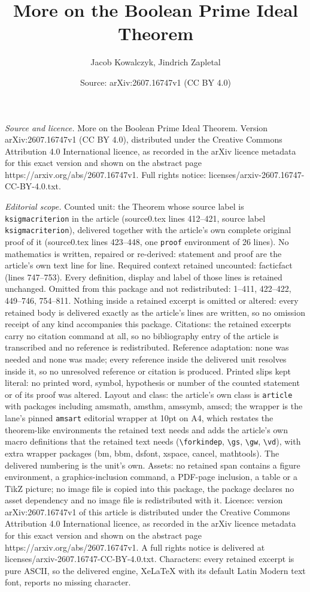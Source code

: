 \documentclass[10pt,a4paper]{amsart}
\title[More on the Boolean Prime Ideal Theorem]{More on the Boolean Prime Ideal Theorem}
\author{Jacob Kowalczyk, Jindrich Zapletal}
\date{Source: arXiv:2607.16747v1 (CC BY 4.0)}
\begin{document}
\maketitle

\noindent\emph{Source and licence.} More on the Boolean Prime Ideal Theorem. Version arXiv:2607.16747v1 (CC BY 4.0), distributed under the Creative Commons Attribution 4.0 International licence, as recorded in the arXiv licence metadata for this exact version and shown on the abstract page https://arxiv.org/abs/2607.16747v1. Full rights notice: licenses/arxiv-2607.16747-CC-BY-4.0.txt.\par\smallskip

\noindent\textit{Editorial scope.} Counted unit: the Theorem whose source label is \texttt{ksigmacriterion} in the article (source0.tex lines 412--421, source label \texttt{ksigmacriterion}), delivered together with the article's own complete original proof of it (source0.tex lines 423--448, one \texttt{proof} environment of 26 lines). No mathematics is written, repaired or re-derived: statement and proof are the article's own text line for line. Required context retained uncounted: facticfact (lines 747--753). Every definition, display and label of those lines is retained unchanged. Omitted from this package and not redistributed: 1--411, 422--422, 449--746, 754--811. Nothing inside a retained excerpt is omitted or altered: every retained body is delivered exactly as the article's lines are written, so no omission receipt of any kind accompanies this package. Citations: the retained excerpts carry no citation command at all, so no bibliography entry of the article is transcribed and no reference is redistributed. Reference adaptation: none was needed and none was made; every reference inside the delivered unit resolves inside it, so no unresolved reference or citation is produced. Printed slips kept literal: no printed word, symbol, hypothesis or number of the counted statement or of its proof was altered. Layout and class: the article's own class is \texttt{article} with packages including amsmath, amsthm, amssymb, amscd; the wrapper is the lane's pinned \texttt{amsart} editorial wrapper at 10pt on A4, which restates the theorem-like environments the retained text needs and adds the article's own macro definitions that the retained text needs (\texttt{\textbackslash forkindep}, \texttt{\textbackslash gs}, \texttt{\textbackslash gw}, \texttt{\textbackslash vd}), with extra wrapper packages (bm, bbm, dsfont, xspace, cancel, mathtools). The delivered numbering is the unit's own. Assets: no retained span contains a figure environment, a graphics-inclusion command, a PDF-page inclusion, a table or a TikZ picture; no image file is copied into this package, the package declares no asset dependency and no image file is redistributed with it. Licence: version arXiv:2607.16747v1 of this article is distributed under the Creative Commons Attribution 4.0 International licence, as recorded in the arXiv licence metadata for this exact version and shown on the abstract page https://arxiv.org/abs/2607.16747v1. A full rights notice is delivered at licenses/arxiv-2607.16747-CC-BY-4.0.txt. Characters: every retained excerpt is pure ASCII, so the delivered engine, XeLaTeX with its default Latin Modern text font, reports no missing character.
\end{document}
